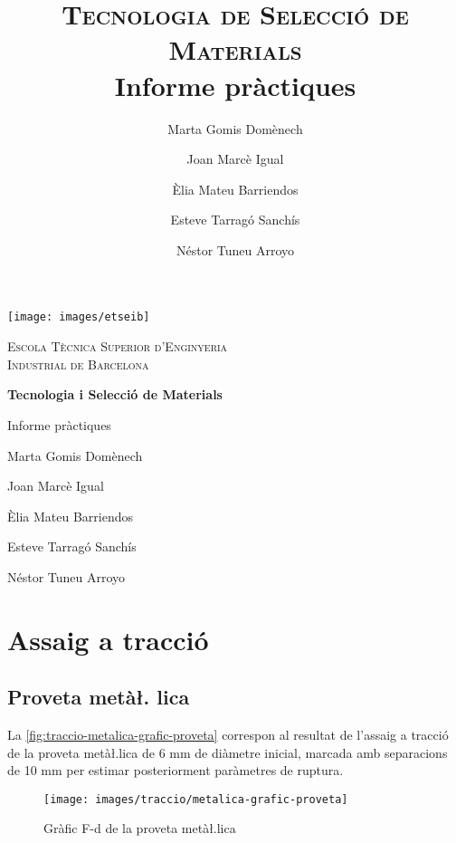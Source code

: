 \documentclass[a4paper]{report}
\title{\textsc{\huge Tecnologia de Selecció de Materials} \\
        Informe pràctiques}
\author{Marta Gomis Domènech \and 
    Joan Marcè Igual \and 
    Èlia Mateu Barriendos \and 
    Esteve Tarragó Sanchís \and 
    Néstor Tuneu Arroyo}
\begin{document}
\begin{titlepage}
    \centering
    \vspace{1cm}
    \texttt{[image: images/etseib]}
    \par\vspace{1cm}
    \textsc{ \LARGE Escola Tècnica Superior d'Enginyeria \\[1em] 
        Industrial de Barcelona}
    \par\vspace{2cm}
    \textbf{\Huge Tecnologia i Selecció de Materials}
    \par\vspace{2cm}
    {\LARGE Informe pràctiques}
    \vfill
    \begin{flushright}
        \large
        Marta Gomis Domènech \par
        Joan Marcè Igual \par
        Èlia Mateu Barriendos \par
        Esteve Tarragó Sanchís \par
        Néstor Tuneu Arroyo
    \end{flushright}
\end{titlepage}

\tableofcontents

\chapter{Assaig a tracció}

\section{Proveta metà\l. lica }

La \autoref{fig:traccio-metalica-grafic-proveta} correspon al resultat de l'assaig a tracció de la proveta metà\l.lica de 6 mm de diàmetre inicial, marcada amb separacions de 10 mm per estimar posteriorment paràmetres de ruptura. 

\begin{figure}[hb]
    \centering
    \texttt{[image: images/traccio/metalica-grafic-proveta]}
    \caption{Gràfic F-d de la proveta metà\l.lica}
    \label{fig:traccio-metalica-grafic-proveta}
\end{figure}
\end{document}
